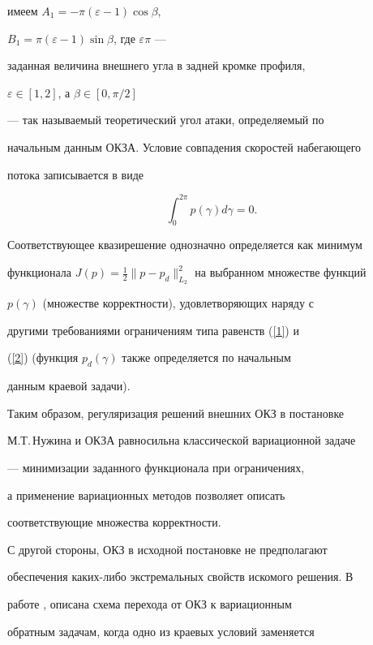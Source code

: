имеем $A_1=-\pi(\varepsilon-1)\cos\beta$,


$B_1=\pi(\varepsilon-1)\sin\beta$, где $\varepsilon \pi$ ---


заданная величина внешнего угла в задней кромке профиля,


$\varepsilon \in [1,2]$, а $\beta \in [0, \pi/2]$


--- так называемый теоретический угол атаки, определяемый по


начальным данным ОКЗА. Условие совпадения скоростей набегающего


потока записывается в виде


\begin{equation}\label{2}


\int_0^{2\pi} p(\gamma) d\gamma =0.


\end{equation}


Соответствующее квазирешение однозначно определяется как минимум


функционала $J(p)=\frac{1}{2}\| p -


p_{d}\|_{L_{2}}^{2}$ на выбранном множестве функций


$p(\gamma)$ (множестве корректности), удовлетворяющих наряду с


другими требованиями ограничениям типа равенств (\ref{1}) и


(\ref{2}) (функция $p_{d}(\gamma)$ также определяется по начальным


данным краевой задачи).





Таким образом, регуляризация решений внешних ОКЗ в постановке


М.Т.\,Ну\-жина и ОКЗА равносильна классической вариационной задаче


--- минимизации заданного функционала при ограничениях,


а применение вариационных методов позволяет описать


соответствующие множества корректности.





С другой стороны, ОКЗ в исходной постановке не предполагают


обеспечения каких-либо экстремальных свойств искомого решения. В


работе \cite{Aks}, \cite{Aks2} описана схема перехода от ОКЗ к вариационным


обратным задачам, когда одно из краевых условий заменяется


